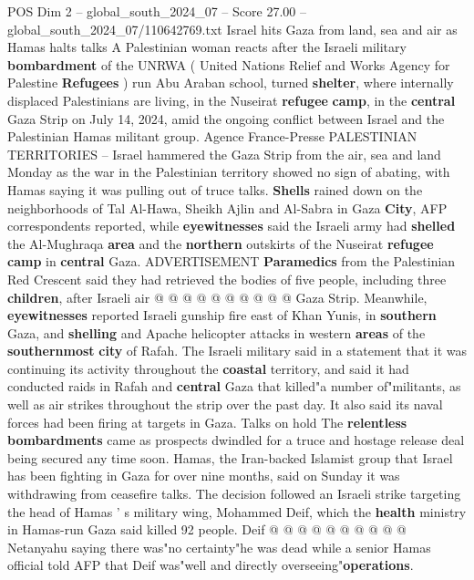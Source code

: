 \begin{textsample}{POS Dim 2 – global\_south\_2024\_07 – Score 27.00 – global\_south\_2024\_07/110642769.txt}  \label{ex:f2_pos_163}
Israel hits Gaza from land, sea and air as Hamas halts talks A Palestinian woman reacts after the Israeli military \textbf{bombardment} of the UNRWA ( United Nations Relief and Works Agency for Palestine \textbf{Refugees} ) run Abu Araban school, turned \textbf{shelter}, where internally displaced Palestinians are living, in the Nuseirat \textbf{refugee} \textbf{camp}, in the \textbf{central} Gaza Strip on July 14, 2024, amid the ongoing conflict between Israel and the Palestinian Hamas militant group.
Agence France-Presse PALESTINIAN TERRITORIES -- Israel hammered the Gaza Strip from the air, sea and land Monday as the war in the Palestinian territory showed no sign of abating, with Hamas saying it was pulling out of truce talks. \textbf{Shells} rained down on the neighborhoods of Tal Al-Hawa, Sheikh Ajlin and Al-Sabra in Gaza \textbf{City}, AFP correspondents reported, while \textbf{eyewitnesses} said the Israeli army had \textbf{shelled} the Al-Mughraqa \textbf{area} and the \textbf{northern} outskirts of the Nuseirat \textbf{refugee} \textbf{camp} in \textbf{central} Gaza.
ADVERTISEMENT \textbf{Paramedics} from the Palestinian Red Crescent said they had retrieved the bodies of five people, including three \textbf{children}, after Israeli air @ @ @ @ @ @ @ @ @ @ Gaza Strip.
Meanwhile, \textbf{eyewitnesses} reported Israeli gunship fire east of Khan Yunis, in \textbf{southern} Gaza, and \textbf{shelling} and Apache helicopter attacks in western \textbf{areas} of the \textbf{southernmost} \textbf{city} of Rafah.
The Israeli military said in a statement that it was continuing its activity throughout the \textbf{coastal} territory, and said it had conducted raids in Rafah and \textbf{central} Gaza that killed"a number of"militants, as well as air strikes throughout the strip over the past day.
It also said its naval forces had been firing at targets in Gaza.
Talks on hold The \textbf{relentless} \textbf{bombardments} came as prospects dwindled for a truce and hostage release deal being secured any time soon.
Hamas, the Iran-backed Islamist group that Israel has been fighting in Gaza for over nine months, said on Sunday it was withdrawing from ceasefire talks.
The decision followed an Israeli strike targeting the head of Hamas ' s military wing, Mohammed Deif, which the \textbf{health} ministry in Hamas-run Gaza said killed 92 people.
Deif @ @ @ @ @ @ @ @ @ @ Netanyahu saying there was"no certainty"he was dead while a senior Hamas official told AFP that Deif was"well and directly overseeing"\textbf{operations}.

\end{textsample}
